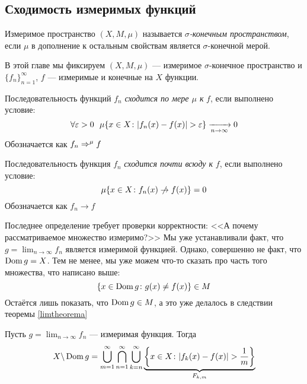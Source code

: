 \subsection{Сходимость измеримых функций}

\begin{definition}
	Измеримое пространство $(X, M, \mu)$ называется \textit{$\sigma$-конечным пространством}, если $\mu$ в дополнение к остальным свойствам является $\sigma$-конечной мерой.
\end{definition}

\begin{note}
	В этой главе мы фиксируем $(X, M, \mu)$ --- измеримое $\sigma$-конечное пространство и $\{f_n\}_{n = 1}^\infty$, $f$ --- измеримые и конечные на $X$ функции.
\end{note}

\begin{definition}
	Последовательность функций $f_n$ \textit{сходится по мере $\mu$ к} $f$, если выполнено условие:
	\[
		\forall \varepsilon > 0\ \ \mu\{x \in X \colon |f_n(x) - f(x)| > \varepsilon\} \xrightarrow[n \to \infty]{} 0
	\]
	Обозначается как $f_n \Rightarrow^\mu f$
\end{definition}

\begin{definition}
	Последовательность функция $f_n$ \textit{сходится почти всюду к} $f$, если выполнено условие:
	\[
		\mu\{x \in X \colon f_n(x) \centernot\to f(x)\} = 0
	\]
	Обозначается как $f_n \to f$
\end{definition}

\begin{note}
	Последнее определение требует проверки корректности: <<А почему рассматриваемое множество измеримо?>> Мы уже устанавливали факт, что $g = \lim_{n \to \infty} f_n$ является измеримой функцией. Однако, совершенно не факт, что $\operatorname{Dom} g = X$. Тем не менее, мы уже можем что-то сказать про часть того множества, что написано выше:
	\[
		\{x \in \operatorname{Dom} g \colon g(x) \neq f(x)\} \in M
	\]
	Остаётся лишь показать, что $\operatorname{Dom} g \in M$, а это уже делалось в следствии теоремы \ref{limtheorema}
\end{note}

\begin{lemma}
	Пусть $g = \lim_{n \to \infty} f_n$ --- измеримая функция. Тогда
	\[
		X \backslash \operatorname{Dom} g = \bigcup_{m = 1}^\infty \bigcap_{n = 1}^\infty \bigcup_{k = n}^\infty \underbrace{\left\{x \in X \colon |f_k(x) - f(x)| > \frac{1}{m}\right\}}_{F_{k, m}}
	\]
\end{lemma}


